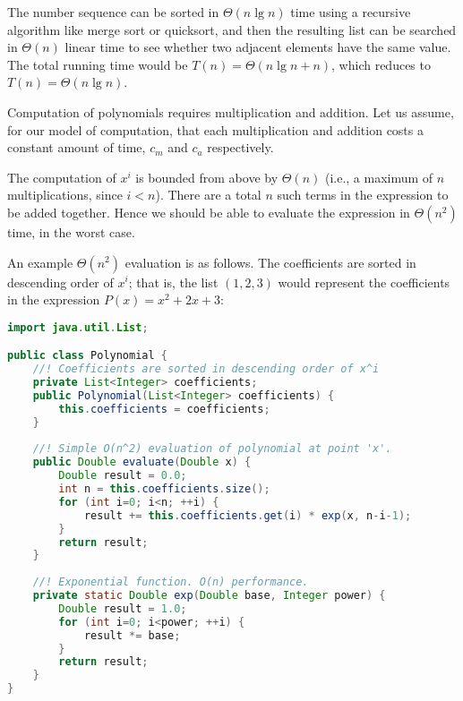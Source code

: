 \documentclass[a4paper,12pt]{article}
\begin{document}
The number sequence can be sorted in $\Theta(n \lg n)$ time using a recursive algorithm like merge sort or quicksort, and then the resulting list can be 
searched in $\Theta(n)$ linear time to see whether two adjacent elements have the same value. The total running time would be $T(n) = \Theta(n\lg n + n)$,  which reduces 
to $T(n) = \Theta(n \lg n)$.

\vspace{5mm}


\newpage
Computation of polynomials requires multiplication and addition. Let us assume, for our model of computation, that each multiplication and addition costs a constant amount of time, $c_m$ and $c_a$ respectively. 

The computation of $x^i$ is bounded from above by $\Theta(n)$  (i.e., a maximum of $n$ multiplications, since $i < n$). There are a total $n$ such terms in the expression to be added together. Hence we should
be able to evaluate the expression in $\Theta(n^2)$ time, in the worst case. 

An example $\Theta(n^2)$ evaluation is as follows. The coefficients are sorted in descending order of
$x^i$; that is, the list $(1, 2, 3)$ would represent the coefficients in the expression $P(x) = x^2 + 2x + 3$:

\begin{lstlisting}[language=Java]
import java.util.List;

public class Polynomial {
    //! Coefficients are sorted in descending order of x^i
    private List<Integer> coefficients;
    public Polynomial(List<Integer> coefficients) {
        this.coefficients = coefficients;
    }
    
    //! Simple O(n^2) evaluation of polynomial at point 'x'.
    public Double evaluate(Double x) {
        Double result = 0.0;
        int n = this.coefficients.size();
        for (int i=0; i<n; ++i) {
            result += this.coefficients.get(i) * exp(x, n-i-1);
        }
        return result;
    }
    
    //! Exponential function. O(n) performance.
    private static Double exp(Double base, Integer power) {
        Double result = 1.0;
        for (int i=0; i<power; ++i) {
            result *= base;
        }
        return result;
    }
}

\end{lstlisting}
\end{document}
